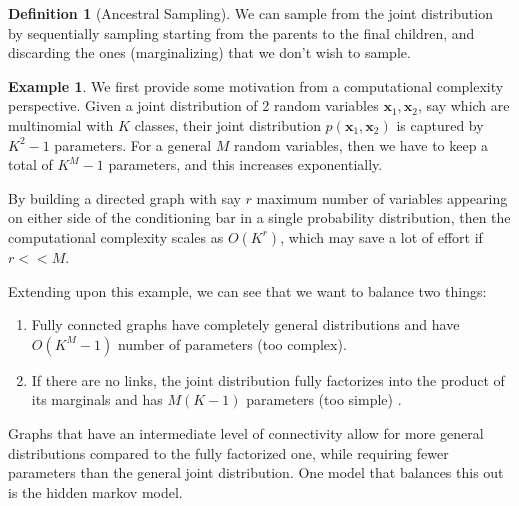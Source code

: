 \documentclass{article}
\theoremstyle{definition}
\newtheorem{example}{Example}[section]
\theoremstyle{remark}
\theoremstyle{definition}
\newtheorem{definition}{Definition}[section]
\begin{document}
\begin{definition}[Ancestral Sampling] 
We can sample from the joint distribution by sequentially sampling starting from the parents to the final children, and discarding the ones (marginalizing) that we don't wish to sample. 
\end{definition}


\begin{example}
We first provide some motivation from a computational complexity perspective. Given a joint distribution of 2 random variables $\mathbf{x}_1, \mathbf{x}_2$, say which are multinomial with $K$ classes, their joint distribution $p(\mathbf{x}_1, \mathbf{x}_2)$ is captured by $K^2 - 1$ parameters. For a general $M$ random variables, then we have to keep a total of $K^M - 1$ parameters, and this increases exponentially. 
\begin{center}

\end{center}
By building a directed graph with say $r$ maximum number of variables appearing on either side of the conditioning bar in a single probability distribution, then the computational complexity scales as $O(K^r)$, which may save a lot of effort if $r << M$. 
\end{example}

Extending upon this example, we can see that we want to balance two things: 
\begin{enumerate} 
    \item Fully conncted graphs have completely general distributions and have $O(K^M -1)$ number of parameters (too complex). 
    \item If there are no links, the joint distribution fully factorizes into the product of its marginals and has $M(K-1)$ parameters (too simple) . 
\end{enumerate}
Graphs that have an intermediate level of connectivity allow for more general distributions compared to the fully factorized one, while requiring fewer parameters than the general joint distribution. One model that balances this out is the hidden markov model. 
\end{document}

